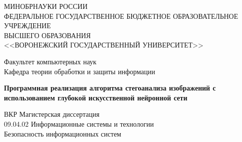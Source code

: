 \begin{titlepage}

\centering
\begingroup
\fontsize{12pt}{12pt}\selectfont
МИНОБРНАУКИ РОССИИ\\
\endgroup
\begingroup
\fontsize{11pt}{11pt}\selectfont
ФЕДЕРАЛЬНОЕ ГОСУДАРСТВЕННОЕ БЮДЖЕТНОЕ ОБРАЗОВАТЕЛЬНОЕ УЧРЕЖДЕНИЕ\\
ВЫСШЕГО ОБРАЗОВАНИЯ\\
\endgroup
\begingroup
\fontsize{12pt}{12pt}\selectfont
<<ВОРОНЕЖСКИЙ ГОСУДАРСТВЕННЫЙ УНИВЕРСИТЕТ>>\\

\vspace{20mm}

Факультет компьютерных наук\\
Кафедра теории обработки и защиты информации\\
\endgroup
\vspace{25mm}

\textbf{
Программная реализация алгоритма стегоанализа изображений с использованием глубокой искусственной нейронной сети}

\vspace{25mm}
\begingroup
\fontsize{12pt}{12pt}\selectfont
ВКР Магистерская диссертация\\
09.04.02 Информационные системы и технологии\\
Безопасность информационных систем\\

\vspace{30mm}


\end{titlepage}
